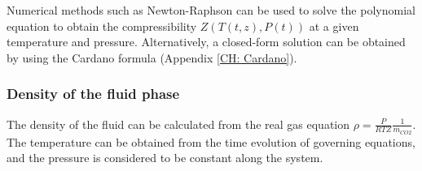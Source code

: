 \documentclass[../Article_Model_Parameters.tex]{subfiles}
\begin{document}
	Numerical methods such as Newton-Raphson can be used to solve the polynomial equation to obtain the compressibility $Z\left(T(t,z), P(t)\right)$ at a given temperature and pressure. Alternatively, a closed-form solution can be obtained by using the Cardano formula (Appendix \ref{CH: Cardano}).
	
	\subsubsection{Density of the fluid phase} \label{subsubsec: Fluid density}
	
	The density of the fluid can be calculated from the real gas equation $\rho = \frac{P}{RTZ} \frac{1}{m_{CO2}}$. The temperature can be obtained from the time evolution of governing equations, and the pressure is considered to be constant along the system. 
	
\end{document}
